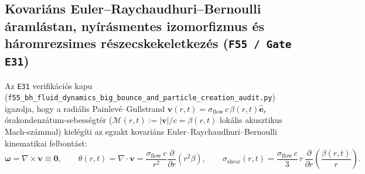 \documentclass[11pt,a4paper]{article}
\theoremstyle{remark}
\begin{document}
\subsection{Kovari\'ans Euler--Raychaudhuri--Bernoulli \'araml\'astan, ny\'ir\'asmentes izomorfizmus \'es h\'aromrezsimes r\'eszecskekeletkez\'es (\texttt{F55 / Gate E31})}
\label{sec:f55_fluid_dynamics}

Az \texttt{E31} verifik\'aci\'os kapu (\texttt{f55\_\allowbreak bh\_\allowbreak fluid\_\allowbreak dynamics\_\allowbreak big\_\allowbreak bounce\_\allowbreak and\_\allowbreak particle\_\allowbreak creation\_\allowbreak audit.py}) igazolja, hogy a radi\'alis Painlev\'e--Gullstrand $\mathbf{v}(r,t) = \sigma_{\mathrm{flow}}\,c\,\beta(r,t)\hat{\mathbf{e}}_r$ \'orakondenz\'atum-sebess\'egt\'er ($\mathcal{M}(r,t) := |\mathbf{v}|/c = \beta(r,t)$ lok\'alis akusztikus Mach-sz\'ammal) kiel\'eg\'iti az egzakt kovari\'ans Euler--Raychaudhuri--Bernoulli kinematikai felbont\'ast:
\begin{equation}
  \boldsymbol{\omega} = \nabla\times\mathbf{v} \equiv \mathbf{0}, \qquad
  \theta(r,t) = \nabla\cdot\mathbf{v} = \frac{\sigma_{\mathrm{flow}}\,c}{r^2}\frac{\partial}{\partial r}\!\left(r^2\beta\right), \qquad
  \sigma_{\mathrm{shear}}(r,t) = \frac{\sigma_{\mathrm{flow}}\,c}{3}\,r\,\frac{\partial}{\partial r}\!\left(\frac{\beta(r,t)}{r}\right).
  \label{eq:f55_kinematics}
\end{equation}
\end{document}

